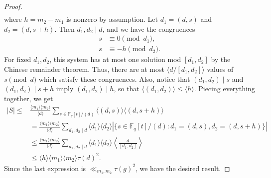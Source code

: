 \documentclass{article}
\theoremstyle{definition}
\theoremstyle{definition}
\theoremstyle{remark}
\newcommand{\F}{\mathbb{F}_q[t]}
\newcommand{\1}{\mathbf{1}}
\numberwithin{equation}{section}
\begin{document}
\begin{proof}
\begin{align*}
\end{align*}
where $h=m_2-m_1$ is nonzero by assumption. Let $d_1=(d,s)$ and $d_2=(d,s+h)$. Then $d_1,d_2\mid d$, and we have the congruences 
\begin{align*}
s&\equiv 0\pmod{d_1},\\
s&\equiv -h\pmod{d_2}.
\end{align*}
For fixed $d_1,d_2$, this system has at most one solution mod $[d_1,d_2]$ by the Chinese remainder theorem. Thus, there are at most $\langle d\slash[d_1,d_2]\rangle $ values of $s\pmod{d}$ which satisfy these congruences. Also, notice that $(d_1,d_2)\mid s$ and $(d_1,d_2)\mid s+h$ imply $(d_1,d_2)\mid h$, so that $\langle (d_1,d_2)\rangle \leq \langle h \rangle$. Piecing everything together, we get 
\begin{align*}
|S|\leq &\frac{\langle m_1\rangle \langle m_2\rangle }{\langle d \rangle }\sum_{s\in \F\slash (d)}\langle (d,s)\rangle \langle (d,s+h)\rangle\\
&=\frac{\langle m_1\rangle \langle m_2\rangle }{\langle d \rangle }\sum_{d_1,d_2\mid d}\langle d_1\rangle \langle d_2\rangle |\{s\in \F\slash (d): d_1=(d,s), d_2=(d,s+h)\}|\\
&\leq \frac{\langle m_1\rangle \langle m_2\rangle }{\langle d \rangle }\sum_{d_1,d_2\mid d}\langle d_1\rangle \langle d_2\rangle \left\langle \frac{d }{[d_1,d_2]}\right\rangle\\
&\leq \langle h \rangle \langle m_1\rangle \langle m_2\rangle \tau(d)^2.
\end{align*}
Since the last expression is $\ll_{m_1,m_2}\tau(g)^2$, we have the desired result. 
\end{proof}
\end{document}
